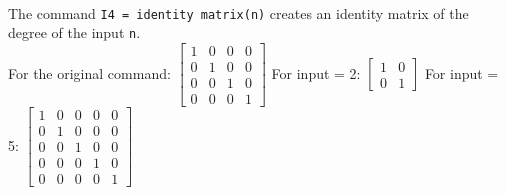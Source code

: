 \documentclass{article}
\begin{document}
\\[0.1in] The command \verb+I4 = identity matrix(n)+ creates an identity matrix of the degree of the input \verb+n+. 
\\[0.1in]For the original command: $\begin{bmatrix}1 & 0 & 0 & 0 \\0 & 1 & 0 & 0 \\0 & 0 & 1 & 0 \\0 & 0 & 0 & 1\end{bmatrix}$ 
For input = 2: $\begin{bmatrix}1 & 0 \\0 & 1\end{bmatrix}$
For input = 5: $\begin{bmatrix}1 & 0 & 0 & 0 & 0 \\0 & 1 & 0 & 0 & 0 \\0 & 0 & 1 & 0 & 0 \\0 & 0 & 0 & 1 & 0 \\0 & 0 & 0 & 0 & 1\end{bmatrix}$
\pagebreak
\end{document}
